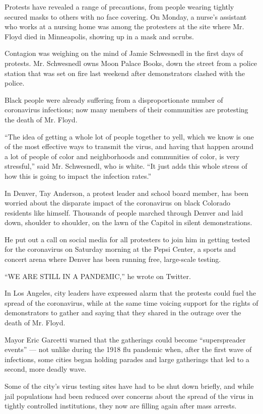 Protests have revealed a range of precautions, from people wearing
tightly secured masks to others with no face covering. On Monday, a
nurse's assistant who works at a nursing home was among the protesters
at the site where Mr. Floyd died in Minneapolis, showing up in a mask
and scrubs.

Contagion was weighing on the mind of Jamie Schwesnedl in the first days
of protests. Mr. Schwesnedl owns Moon Palace Books, down the street from
a police station that was set on fire last weekend after demonstrators
clashed with the police.

Black people were already suffering from a disproportionate number of
coronavirus infections; now many members of their communities are
protesting the death of Mr. Floyd.

``The idea of getting a whole lot of people together to yell, which we
know is one of the most effective ways to transmit the virus, and having
that happen around a lot of people of color and neighborhoods and
communities of color, is very stressful,'' said Mr. Schwesnedl, who is
white. ``It just adds this whole stress of how this is going to impact
the infection rates.''

In Denver, Tay Anderson, a protest leader and school board member, has
been worried about the disparate impact of the coronavirus on black
Colorado residents like himself. Thousands of people marched through
Denver and laid down, shoulder to shoulder, on the lawn of the Capitol
in silent demonstrations.

He put out a call on social media for all protesters to join him in
getting tested for the coronavirus on Saturday morning at the Pepsi
Center, a sports and concert arena where Denver has been running free,
large-scale testing.

``WE ARE STILL IN A PANDEMIC,'' he wrote on Twitter.

In Los Angeles, city leaders have expressed alarm that the protests
could fuel the spread of the coronavirus, while at the same time voicing
support for the rights of demonstrators to gather and saying that they
shared in the outrage over the death of Mr. Floyd.

Mayor Eric Garcetti warned that the gatherings could become
``superspreader events'' --- not unlike during the 1918 flu pandemic
when, after the first wave of infections, some cities began holding
parades and large gatherings that led to a second, more deadly wave.

Some of the city's virus testing sites have had to be shut down briefly,
and while jail populations had been reduced over concerns about the
spread of the virus in tightly controlled institutions, they now are
filling again after mass arrests.

